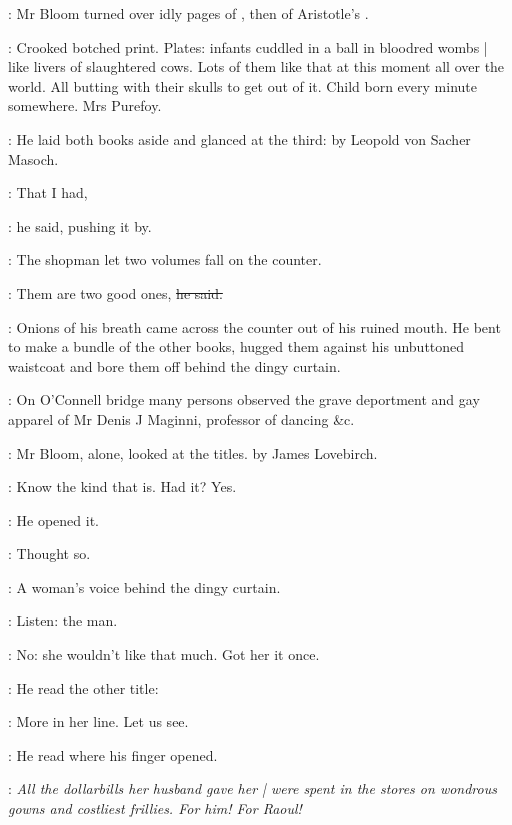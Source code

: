 :
Mr Bloom turned over idly pages of
,
then of Aristotle's .

\BloomInt:
Crooked botched print.
Plates:
infants cuddled in a ball in bloodred wombs |
like livers of slaughtered cows.
Lots of them like that at this moment all over the world.
All butting with their skulls to get out of it.
Child born every minute somewhere.
Mrs Purefoy.%

:
He laid both books aside and glanced at the third:
by Leopold von Sacher Masoch.

\Bloom:
That I had,

:
he said,
pushing it by.

:
The shopman let two volumes fall on the counter.

\shopman:
Them are two good ones,
\sout{he said.}

:
Onions of his breath came across the counter
out of his ruined mouth.
He bent to make a bundle of the other books,
hugged them against his unbuttoned waistcoat
and bore them off behind the dingy curtain.

\begin{interject}
    :
    On O'Connell bridge
    many persons observed the grave deportment
    and gay apparel of Mr Denis J Maginni,
    professor of dancing \&c.
\end{interject}

:
Mr Bloom, alone,
looked at the titles.
 by James Lovebirch.

\BloomInt:
Know the kind that is.
Had it?
Yes.

:
He opened it.

\BloomInt:
Thought so.

:
A woman's voice behind the dingy curtain.

\BloomInt:
Listen: the man.

\BloomInt:
No:
she wouldn't like that much.
Got her it once.

:
He read the other title:

\BloomInt:
More in her line.
Let us see.

:
He read where his finger opened.

\BloomInt:
\emph{All the dollarbills her husband gave her |
were spent in the stores
on wondrous gowns and costliest frillies.
For him!
For Raoul!}

